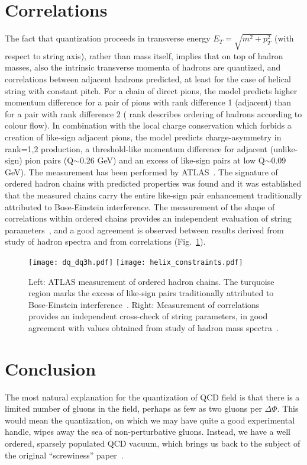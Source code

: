 \documentclass[Physsubmission, Phys]{SciPost}
\begin{document}
\section{Correlations}
    The fact that quantization proceeds in transverse energy
    $E_T=\sqrt{m^2 +p_T^2}$ (with respect to string axis), rather than
    mass itself,  implies that on top of hadron masses, also the
    intrinsic transverse momenta of hadrons are quantized, and
    correlations between adjacent hadrons predicted, at least for the
    case of helical string with constant pitch. For a chain of direct
    pions, the model predicts higher momentum difference for a pair of
    pions with rank difference 1 (adjacent) than for a pair with rank
    difference 2 ( rank describes ordering of hadrons according to
    colour flow). In combination with the local charge conservation
    which forbids a creation of like-sign adjacent pions, the model
    predicts charge-asymmetry in rank=1,2 production, a threshold-like
    momentum difference for adjacent (unlike-sign) pion pairs
    (Q$\sim$0.26 GeV) and 
    an excess of like-sign pairs at low Q$\sim$0.09 GeV). The
    measurement has been performed by ATLAS~\cite{ATLAS-chains}. The
    signature of ordered hadron chains with predicted properties was found
    and it was established that the measured chains carry the entire
    like-sign pair enhancement traditionally attributed to
    Bose-Einstein interference.  The measurement of the shape of
    correlations within ordered chains provides an independent
    evaluation of string parameters~\cite{baryons}, and a good
    agreement is observed between results derived from study of hadron
    spectra and from correlations (Fig.~\ref{fig:correlations}).

 \begin{figure}[h]
\centering
\texttt{[image: dq\_dq3h.pdf]}
\texttt{[image: helix\_constraints.pdf]}
\caption{ Left: ATLAS measurement of ordered hadron chains. The
  turquoise region marks the excess of like-sign pairs traditionally
  attributed to Bose-Einstein interference~\cite{ATLAS-chains}. Right:
  Measurement of correlations provides an independent cross-check of
  string parameters, in good agreement with values obtained from study
  of hadron mass spectra~\cite{baryons}.   
\label{fig:correlations}}
\end{figure}
 
\section{Conclusion}
   The most natural explanation for the quantization of QCD field is
   that there is a limited number of gluons in the field, perhaps as
   few as two gluons per $\Delta\Phi$. This would mean the
   quantization, on which we may have quite a good experimental
   handle, wipes away the sea of non-perturbative gluons. Instead, we
   have a well ordered, sparsely populated QCD vacuum, which
   brings us back to the subject of the original ``screwiness'' paper~\cite{lund_helix}.  
\end{document}
